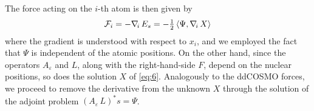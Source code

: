 
The force acting on the $i$-th atom is then given by
\[
\mathcal{F}_i = -\nabla_{\!i}\, E_s = - \tfrac{1}{2} 
\,  \langle \Psi, \nabla_{\!i}\, X \rangle 
\]
where the gradient is understood with respect to $x_i$, and we employed the fact that $\Psi$ is independent of the atomic positions. On the other hand, since the operators $A_\varepsilon$ and $L$, along with the right-hand-side $F$, depend on the nuclear positions, so does the solution $X$ of \eqref{eq:6}. Analogously to the ddCOSMO forces, we proceed to remove the derivative from the unknown $X$ through the solution of the adjoint problem $(A_\varepsilon \, L)^* s = \Psi$.

